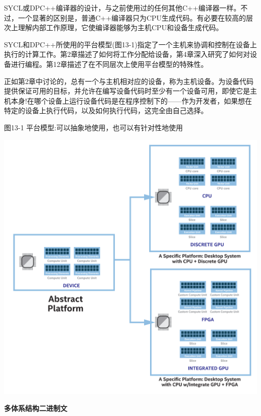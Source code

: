 SYCL或DPC++编译器的设计，与之前使用过的任何其他C++编译器一样。不过，一个显著的区别是，普通C++编译器只为CPU生成代码。有必要在较高的层次上理解内部工作原理，它使编译器能够为主机CPU和设备生成代码。\par

SYCL和DPC++所使用的平台模型(图13-1)指定了一个主机来协调和控制在设备上执行的计算工作。第2章描述了如何将工作分配给设备，第4章深入研究了如何对设备进行编程。第12章描述了在不同层次上使用平台模型的特殊性。\par

正如第2章中讨论的，总有一个与主机相对应的设备，称为主机设备。为设备代码提供保证可用的目标，并允许在编写设备代码时至少有一个设备可用，即使它是主机本身!在哪个设备上运行设备代码是在程序控制下的——作为开发者，如果想在特定的设备上执行代码，以及如何执行代码，这完全由自己选择。\par

\hspace*{\fill} \par %
图13-1 平台模型:可以抽象地使用，也可以有针对性地使用
\begin{center}
	\includegraphics[width=1.\textwidth]{content/chapter-13/images/2}
\end{center}

\hspace*{\fill} \par %
\textbf{多体系结构二进制文}

